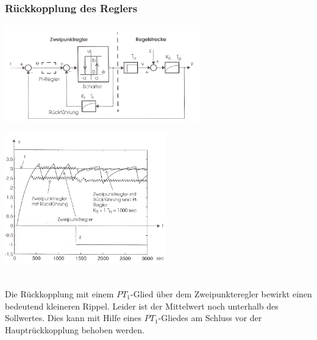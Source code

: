     \subsubsection{Rückkopplung des Reglers }
		\begin{minipage}{9cm}
		\includegraphics[width=8.5cm]{./bilder/ZweipunktreglerMitRueckfuehrung.jpg}
        \end{minipage}
		\begin{minipage}{7.5cm}
        \includegraphics[width=7cm]{./bilder/ZweipunktreglerMitRueckfuehrung_dia.jpg}
        \end{minipage}\\
		Die Rückkopplung mit einem $PT_1$-Glied über dem Zweipunkteregler bewirkt
		einen bedeutend kleineren Rippel. Leider ist der Mittelwert noch unterhalb des
		Sollwertes. Dies kann mit Hilfe eines $PT_1$-Gliedes am Schluss vor der
		Hauptrückkopplung behoben werden.
	
